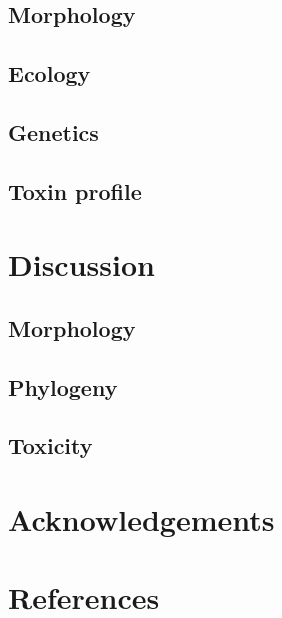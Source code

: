 \documentclass[12pt]{article}
\begin{document}
\subsection{Morphology}

\subsection{Ecology}

\subsection{Genetics}

\subsection{Toxin profile}

\section{Discussion}

\subsection{Morphology}

\subsection{Phylogeny}

\subsection{Toxicity}

\section{Acknowledgements}

\section{References}

\newpage


\end{document}
